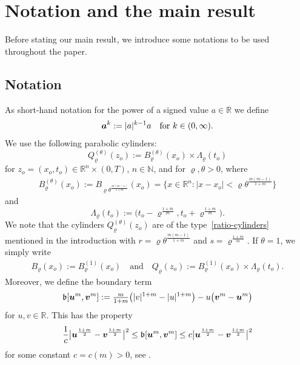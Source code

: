 \documentclass[a4paper, 10pt, american]{amsart}
\numberwithin{theorem}{section}
\numberwithin{equation}{section}
\def\N{\mathbb{N}}
\def\R{\mathbb{R}}
\renewcommand{\rho}{\varrho}
\newcommand{\power}[2]{\bm{#1^{\mbox{\unboldmath{\scriptsize$#2$}}}}}
\newcommand{\abs}[1]{|#1|}
\begin{document}
\section{Notation and the main result}

Before stating our main result, we introduce some notations to be used
throughout the paper.

\subsection{Notation}
As short-hand notation for the power of a signed value $a\in \R$ we define
$$\power ak := |a|^{k-1}a \quad\mbox{for $k\in(0,\infty)$}.$$
We use the following parabolic cylinders:
\begin{equation}\label{def-Q}
	Q_\rho^{(\theta)}(z_o)
	:=
	B_\rho^{(\theta)}(x_o)\times\Lambda_\rho(t_o)
\end{equation}
for $z_o=(x_o,t_o)\in\R^n\times(0,T)$, $n\in\N$, and for $\rho,\theta>0$,
where  
\begin{align*}
B_\rho^{(\theta)}(x_o):=B_{\rho\theta^\frac{m(m-1)}{1+m}}(x_o)
=\big\{x\in\R^n:|x-x_o|<\rho\theta^\frac{m(m-1)}{1+m}\big\}
\end{align*}
and
\begin{equation*}
  \Lambda_\rho(t_o)
  :=
  \big(t_o-\rho^{\frac{1+m}{m}},t_o+\rho^{\frac{1+m}{m}}\big).
\end{equation*}
We note that the cylinders $Q_\rho^{(\theta)}(z_o)$ are of the
type~\eqref{ratio-cylinders} mentioned in the introduction with
$r=\rho\theta^{\frac{m(m-1)}{1+m}} $ and $s=\rho^{\frac{1+m}m}$.
If $\theta=1$, we simply write
\begin{align*}
B_\rho(x_o):=B_\rho^{(1)}(x_o)
\quad\mbox{and}\quad
Q_\rho(z_o):=B_\rho^{(1)}(x_o)\times\Lambda_\rho(t_o).
\end{align*}
Moreover, we define the boundary term
\begin{align}\label{def:b}
	\mathfrak b[\power{u}{m},\power{v}{m}]
	:=
	\tfrac{m}{1+m}\big(\abs{v}^{1+m} - \abs{u}^{1+m}\big) - u\big(\power{v}{m} - \power{u}{m}\big)
\end{align}
for $u,v\in\R$. 
This has the property
\begin{align}\label{boundary-term}
\frac1{c}\big|\power{u}{\frac{1+m}{2}}-\power{v}{\frac{1+m}{2}}\big|^2 
	\le
	\mathfrak b[\power{u}{m},\power{v}{m}]
	\le
	c \big|\power{u}{\frac{1+m}{2}}-\power{v}{\frac{1+m}{2}}\big|^2
\end{align}
for some constant $c=c(m)>0$, see \cite[Lemma 3.4]{BDKS:2018}.
\end{document}
